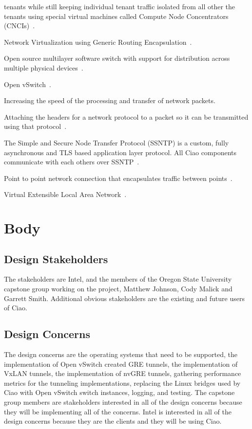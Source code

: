 \documentclass[10pt,onecolumn,journal,draftclsnofoot]{IEEEtran}
\begin{document}
\begin{description}[leftmargin=12em,style=nextline]
		tenants while still keeping individual tenant traffic isolated
		from all other the tenants using special virtual machines called
		Compute Node Concentrators (CNCIs)~\cite{ciaoNetworking}.
	\item[nvGRE]
		Network Virtualization using Generic Routing
		Encapsulation~\cite{rfc7637}.
	\item[Open vSwitch]
		Open source multilayer software switch with support for
		distribution across multiple physical devices~\cite{ovs}.
	\item[OVS]
		Open vSwitch~\cite{ovs}.
	\item[Packet Acceleration]
		Increasing the speed of the processing and transfer of network
		packets.
	\item[Packet Encapsulation]
		Attaching the headers for a network protocol to a packet so it
		can be transmitted using that
		protocol~\cite{networkingTextbook}.
	\item[SSNTP]
		The Simple and Secure Node Transfer Protocol (SSNTP) is a
		custom, fully asynchronous and TLS based application layer
		protocol. All Ciao components communicate with each others over
		SSNTP~\cite{ciaoSSNTP}.
	\item[Tunnel]
		Point to point network connection that encapsulates traffic
		between points~\cite{networkingTextbook}.
	\item[VxLAN]
		Virtual Extensible Local Area Network~\cite{rfc7348}.
\end{description}

\section{Body}
\subsection{Design Stakeholders}
The stakeholders are Intel, and the members of the Oregon State University
capstone group working on the project, Matthew Johnson, Cody Malick and Garrett
Smith. Additional obvious stakeholders are the existing and future users of
Ciao.

\subsection{Design Concerns}
The design concerns are the operating systems that need to be supported,
the implementation of Open vSwitch created GRE tunnels,
the implementation of VxLAN tunnels, the implementation of nvGRE tunnels,
gathering performance metrics for the tunneling implementations, replacing
the Linux bridges used by Ciao with Open vSwitch switch instances, logging, and
testing. The capstone group members are stakeholders interested in all of the
design concerns because they will be implementing all of the concerns. Intel is
interested in all of the design concerns because they are the clients and they
will be using Ciao.
\end{document}
